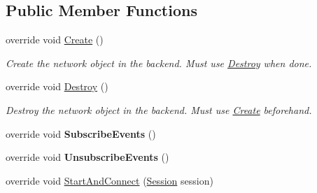 \subsection*{Public Member Functions}
\begin{DoxyCompactItemize}
\item 
\hypertarget{class_skyrates_1_1_server_1_1_network_1_1_client_server_ac463029e68748fb812055a0d1de5d573}{override void \hyperlink{class_skyrates_1_1_server_1_1_network_1_1_client_server_ac463029e68748fb812055a0d1de5d573}{Create} ()}\label{class_skyrates_1_1_server_1_1_network_1_1_client_server_ac463029e68748fb812055a0d1de5d573}

\begin{DoxyCompactList}\small\item\em Create the network object in the backend. Must use \hyperlink{class_skyrates_1_1_common_1_1_network_1_1_network_common_aa00266a16aa27dfd0eb242c74856a92a}{Destroy} when done.  \end{DoxyCompactList}\item 
\hypertarget{class_skyrates_1_1_server_1_1_network_1_1_client_server_a4013571313a1149fea8254d61fec476a}{override void \hyperlink{class_skyrates_1_1_server_1_1_network_1_1_client_server_a4013571313a1149fea8254d61fec476a}{Destroy} ()}\label{class_skyrates_1_1_server_1_1_network_1_1_client_server_a4013571313a1149fea8254d61fec476a}

\begin{DoxyCompactList}\small\item\em Destroy the network object in the backend. Must use \hyperlink{class_skyrates_1_1_common_1_1_network_1_1_network_common_a575172eb9f965e181e19649bcce38ca0}{Create} beforehand.  \end{DoxyCompactList}\item 
\hypertarget{class_skyrates_1_1_server_1_1_network_1_1_client_server_a7ac8c730d9ebd189383b31273e905fee}{override void {\bfseries Subscribe\-Events} ()}\label{class_skyrates_1_1_server_1_1_network_1_1_client_server_a7ac8c730d9ebd189383b31273e905fee}

\item 
\hypertarget{class_skyrates_1_1_server_1_1_network_1_1_client_server_a61ed70a703bf755b84cc5cf27946d46d}{override void {\bfseries Unsubscribe\-Events} ()}\label{class_skyrates_1_1_server_1_1_network_1_1_client_server_a61ed70a703bf755b84cc5cf27946d46d}

\item 
\hypertarget{class_skyrates_1_1_server_1_1_network_1_1_client_server_a1ef405c40beac7461286169c5c6898fb}{override void \hyperlink{class_skyrates_1_1_server_1_1_network_1_1_client_server_a1ef405c40beac7461286169c5c6898fb}{Start\-And\-Connect} (\hyperlink{class_skyrates_1_1_common_1_1_network_1_1_session}{Session} session)}\label{class_skyrates_1_1_server_1_1_network_1_1_client_server_a1ef405c40beac7461286169c5c6898fb}


\end{DoxyCompactItemize}
